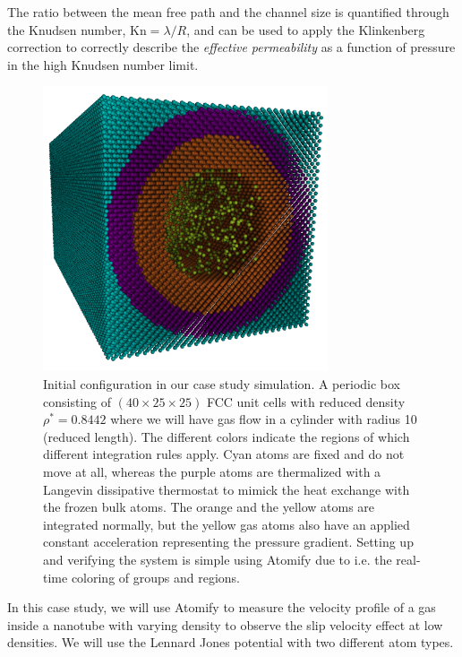 \documentclass[12pt,a4paper,final]{iopart}
\begin{document}
The ratio between the mean free path and the channel size is quantified through
the Knudsen number, $\text{Kn} = \lambda / R$, and can be used to apply the Klinkenberg correction\cite{klinkenberg1941permeability}
to correctly describe the \textit{effective permeability} as a function of pressure in the high Knudsen number limit.

\begin{figure}
	\centering
	\includegraphics[width=0.75\textwidth]{lj_flow/configuration.png}
	\caption{
		Initial configuration in our case study simulation.
		A periodic box consisting of $(40\times25\times25)$ FCC unit cells with reduced density $\rho^* = 0.8442$ where we will have gas flow in a cylinder with radius 10 (reduced length).
		The different colors indicate the regions of which different integration rules apply.
		Cyan atoms are fixed and do not move at all,
		whereas the purple atoms are thermalized with a Langevin\cite{schneider1978molecular} dissipative thermostat to mimick the heat exchange with the frozen bulk atoms.
		The orange and the yellow atoms are integrated normally, but the yellow gas atoms also have an applied constant acceleration representing the pressure gradient.
		Setting up and verifying the system is simple using Atomify due to i.e. the real-time coloring of groups and regions.
    }
	\label{fig:cylinder_simulation}
\end{figure}

In this case study, we will use Atomify to measure the velocity profile of a
gas inside a nanotube with varying density to observe
the slip velocity effect at low densities.
We will use the Lennard Jones potential with two different atom types.
\end{document}
